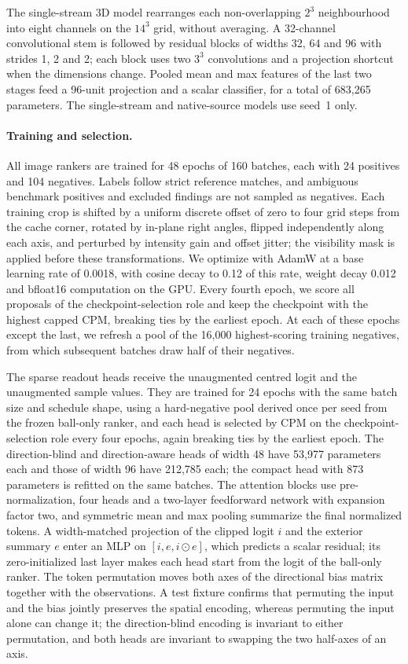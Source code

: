 The single-stream 3D model rearranges each non-overlapping $2^3$ neighbourhood into eight channels on the $14^3$ grid, without averaging. A 32-channel convolutional stem is followed by residual blocks of widths 32, 64 and 96 with strides 1, 2 and 2; each block uses two $3^3$ convolutions and a projection shortcut when the dimensions change. Pooled mean and max features of the last two stages feed a 96-unit projection and a scalar classifier, for a total of 683,265 parameters. The single-stream and native-source models use seed~1 only.

\paragraph{Training and selection.}
All image rankers are trained for 48 epochs of 160 batches, each with 24 positives and 104 negatives. Labels follow strict reference matches, and ambiguous benchmark positives and excluded findings are not sampled as negatives. Each training crop is shifted by a uniform discrete offset of zero to four grid steps from the cache corner, rotated by in-plane right angles, flipped independently along each axis, and perturbed by intensity gain and offset jitter; the visibility mask is applied before these transformations. We optimize with AdamW at a base learning rate of 0.0018, with cosine decay to 0.12 of this rate, weight decay 0.012 and bfloat16 computation on the GPU. Every fourth epoch, we score all proposals of the checkpoint-selection role and keep the checkpoint with the highest capped CPM, breaking ties by the earliest epoch. At each of these epochs except the last, we refresh a pool of the 16,000 highest-scoring training negatives, from which subsequent batches draw half of their negatives.

The sparse readout heads receive the unaugmented centred logit and the unaugmented sample values. They are trained for 24 epochs with the same batch size and schedule shape, using a hard-negative pool derived once per seed from the frozen ball-only ranker, and each head is selected by CPM on the checkpoint-selection role every four epochs, again breaking ties by the earliest epoch. The direction-blind and direction-aware heads of width 48 have 53,977 parameters each and those of width 96 have 212,785 each; the compact head with 873 parameters is refitted on the same batches. The attention blocks use pre-normalization, four heads and a two-layer feedforward network with expansion factor two, and symmetric mean and max pooling summarize the final normalized tokens. A width-matched projection of the clipped logit $i$ and the exterior summary $e$ enter an MLP on $[i,e,i\odot e]$, which predicts a scalar residual; its zero-initialized last layer makes each head start from the logit of the ball-only ranker. The token permutation moves both axes of the directional bias matrix together with the observations. A test fixture confirms that permuting the input and the bias jointly preserves the spatial encoding, whereas permuting the input alone can change it; the direction-blind encoding is invariant to either permutation, and both heads are invariant to swapping the two half-axes of an axis.


